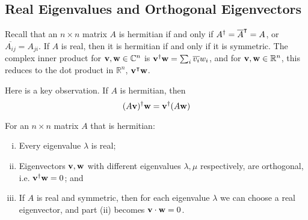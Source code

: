 \subsection{Real Eigenvalues and Orthogonal Eigenvectors}
Recall that an $n\times n$ matrix $A$ is hermitian if and only if $A^\dagger = \overline{A}^\intercal = A$, or $\overline{A_{ij}} = A_{ji}$. If $A$ is real, then it is hermitian if and only if it is symmetric. The complex inner product for $\vb v, \vb w \in \mathbb C^n$ is $\vb v^\dagger \vb w = \sum_i \overline{v_i}w_i$, and for $\vb v, \vb w \in \mathbb R^n$, this reduces to the dot product in $\mathbb R^n$, $\vb v^\intercal \vb w$.

Here is a key observation. If $A$ is hermitian, then
\[ (A\vb v)^\dagger \vb w = \vb v^\dagger (A \vb w) \]
\begin{theorem}
	For an $n \times n$ matrix $A$ that is hermitian:
	\begin{enumerate}[(i)]
		\item Every eigenvalue $\lambda$ is real;
		\item Eigenvectors $\vb v, \vb w$ with different eigenvalues $\lambda, \mu$ respectively, are orthogonal, i.e. $\vb v^\dagger \vb w = 0$; and
		\item If $A$ is real and symmetric, then for each eigenvalue $\lambda$ we can choose a real eigenvector, and part (ii) becomes $\vb v \cdot \vb w = 0$.
	\end{enumerate}
\end{theorem}
